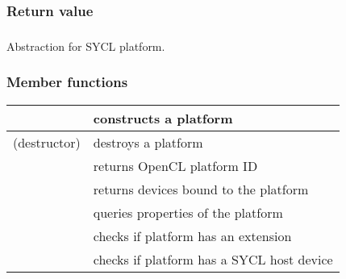 \documentclass[letterpaper,10pt,english]{sphinxmanual}
\begin{document}
\subsubsection*{Return value}


\subsubsection{}
\label{\detokenize{programming-interface/runtime/platform:platform}}\label{\detokenize{programming-interface/runtime/platform::doc}}
\begin{sphinxVerbatim}[commandchars=\\\{\}]
 
\end{sphinxVerbatim}

Abstraction for SYCL platform.
\subsubsection*{Member functions}


\begin{savenotes}\sphinxattablestart
\centering
\begin{tabulary}{\linewidth}[t]{|T|T|}
\hline

{\hyperref[\detokenize{programming-interface/runtime/platform:constructor}]{}}
&
constructs a platform
\\
\hline
(destructor)
&
destroys a platform
\\
\hline
{\hyperref[\detokenize{programming-interface/runtime/platform:get}]{}}
&
returns OpenCL platform ID
\\
\hline
{\hyperref[\detokenize{programming-interface/runtime/platform:get-devices}]{}}
&
returns devices bound to the platform
\\
\hline
{\hyperref[\detokenize{programming-interface/runtime/platform:get-info}]{}}
&
queries properties of the platform
\\
\hline
{\hyperref[\detokenize{programming-interface/runtime/platform:has-extension}]{}}
&
checks if platform has an extension
\\
\hline
{\hyperref[\detokenize{programming-interface/runtime/platform:is-host}]{}}
&
checks if platform has a SYCL host device
\\
\hline
\end{tabulary}
\par
\sphinxattableend\end{savenotes}
\end{document}
